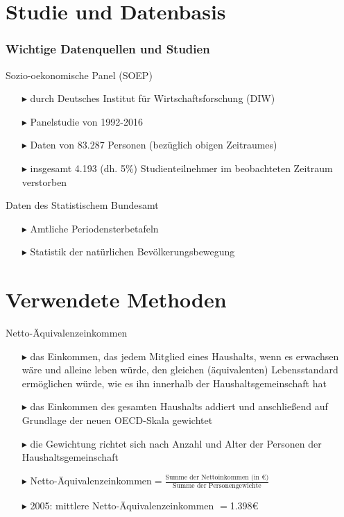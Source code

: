 \documentclass{beamer}
\begin{document}
\section{Studie und Datenbasis}
\begin{frame}
\frametitle{Wichtige Datenquellen und Studien}
  \begin{block}{Sozio-oekonomische Panel (SOEP)}
   \begin{itemize}
     \item [$\blacktriangleright$] durch Deutsches Institut für   Wirtschaftsforschung (DIW)
     \item [$\blacktriangleright$] Panelstudie von 1992-2016
     \item [$\blacktriangleright$] Daten von  83.287 Personen (bezüglich obigen Zeitraumes)
     \item[$\blacktriangleright$] insgesamt 4.193 (dh. 5\%) Studienteilnehmer im beobachteten Zeitraum verstorben
   \end{itemize}
  \end{block}
  \begin{block}{Daten des Statistischem Bundesamt}
   \begin{itemize}
     \item [$\blacktriangleright$] Amtliche Periodensterbetafeln
     \item [$\blacktriangleright$] Statistik der natürlichen Bevölkerungsbewegung
   \end{itemize}
  \end{block}
\end{frame}


\section{Verwendete Methoden}
\begin{frame}{Netto-Äquivalenzeinkommen}
	\begin{itemize}
		\item[$\blacktriangleright$] das Einkommen, das jedem Mitglied eines Haushalts, wenn es erwachsen wäre und alleine leben würde, den gleichen (äquivalenten) Lebensstandard ermöglichen würde, wie es ihn innerhalb der Haushaltsgemeinschaft hat
		\item[$\blacktriangleright$]	das Einkommen des gesamten Haushalts addiert und anschließend auf Grundlage der neuen OECD-Skala gewichtet
		\item[$\blacktriangleright$] die Gewichtung richtet sich nach Anzahl und Alter der Personen der Haushaltsgemeinschaft
		\item[$\blacktriangleright$] Netto-Äquivalenzeinkommen$=\frac{\text{Summe der Nettoinkommen (in €)}}{\text{Summe der Personengewichte}}$
		\item[$\blacktriangleright$] 2005: mittlere Netto-Äquivalenzeinkommen $=$1.398€
	\end{itemize}
\end{frame}
\end{document}
